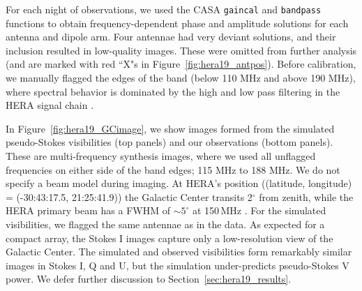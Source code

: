 For each night of observations, we used the {\sc CASA} {\tt gaincal} and {\tt bandpass} functions to obtain frequency-dependent phase and amplitude solutions for each antenna and dipole arm. Four antennae had very deviant solutions, and their inclusion resulted in low-quality images. These were omitted from further analysis (and are marked with red ``X"s in Figure~\ref{fig:hera19_antpos}).  Before calibration, we manually flagged the edges of the band (below 110 MHz and above 190 MHz), where spectral behavior is dominated by the high and low pass filtering in the HERA signal chain \citep{deBoer.17}.

In Figure~\ref{fig:hera19_GCimage}, we show images formed from the simulated pseudo-Stokes visibilities (top panels) and our observations (bottom panels). These are multi-frequency synthesis images, where we used all unflagged frequencies on either side of the band edges; 115 MHz to 188 MHz. We do not specify a beam model during imaging. At HERA's position ((latitude, longitude) = (-30:43:17.5, 21:25:41.9)) the Galactic Center transits 2$^{\circ}$ from zenith, while the HERA primary beam has a FWHM of $\sim5^{\circ}$ at 150\,MHz \citep{Neben.16}. For the simulated visibilities, we flagged the same antennae as in the data. As expected for a compact array, the Stokes I images capture only a low-resolution view of the Galactic Center. The simulated and observed visibilities form remarkably similar images in Stokes I, Q and U, but the simulation under-predicts pseudo-Stokes V power. We defer further discussion to Section~\ref{sec:hera19_results}.

